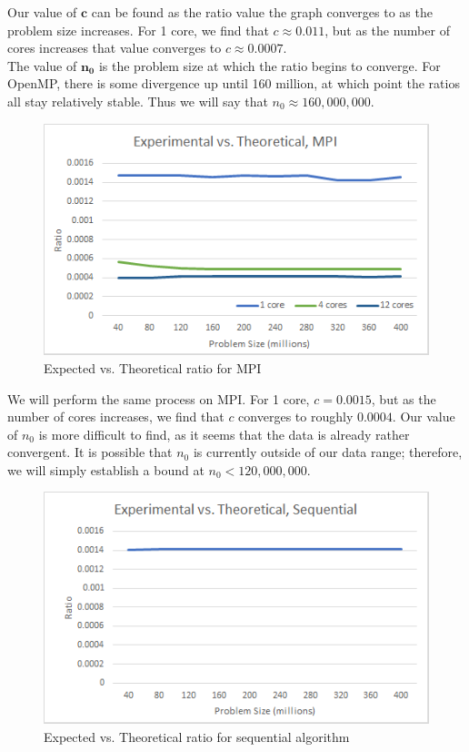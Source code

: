 \documentclass{article}
\begin{document}
Our value of $\mathbf{c}$ can be found as the ratio value the graph converges to as the problem size increases.  For 1 core, we find that $c \approx 0.011$, but as the number of cores increases that value converges to $c \approx 0.0007$. \\

The value of $\mathbf{n_0}$ is the problem size at which the ratio begins to converge.  For OpenMP, there is some divergence up until 160 million, at which point the ratios all stay relatively stable.  Thus we will say that $n_0
\approx 160,000,000$.

\begin{figure}[H]
	\centering

	\includegraphics[width=1.0\textwidth]{figures/evt_mpi.png}

	\caption{Expected vs. Theoretical ratio for MPI}
\end{figure}

We will perform the same process on MPI.  For 1 core, $c = 0.0015$, but as the number of cores increases, we find that $c$ converges to roughly $0.0004$.  Our value of $n_0$ is more difficult to find, as it seems that the data is already rather convergent.  It is possible that $n_0$ is currently outside of our data range; therefore, we will simply establish a bound at $n_0 < 120,000,000$.

\begin{figure}[H]
	\centering

	\includegraphics[width=1.0\textwidth]{figures/evt_seq.png}

	\caption{Expected vs. Theoretical ratio for sequential algorithm}
\end{figure}
\end{document}
